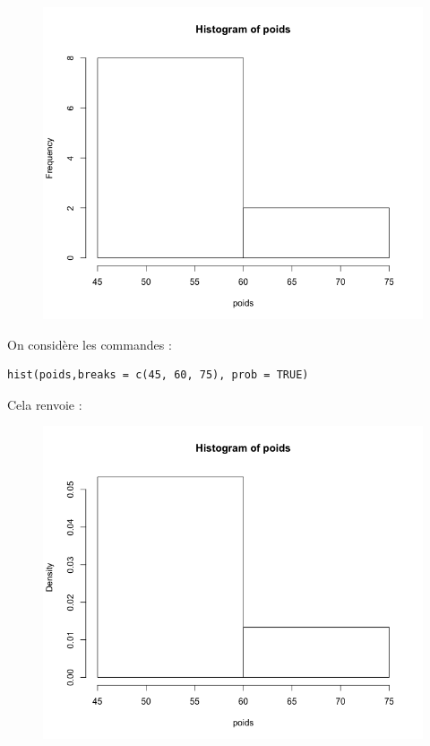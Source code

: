 \begin{figure}[H]\begin{center}\includegraphics[scale=0.4]{ilu/gra45.png}\end{center}\end{figure}
On considère les commandes :
\begin{lstlisting}[language=html]
hist(poids,breaks = c(45, 60, 75), prob = TRUE)
\end{lstlisting}
Cela renvoie :
\begin{figure}[H]\begin{center}\includegraphics[scale=0.4]{ilu/gra46.png}\end{center}\end{figure}
